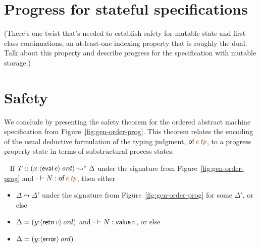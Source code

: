 \section{Progress for stateful specifications}
\label{sec:progess-mutable}

(There's one twist that's needed to establish safety for mutable state
and first-class continuations, an at-least-one indexing property that
is roughly the dual. Talk about this property and describe progress
for the specification with mutable storage.)

\section{Safety}

We conclude by presenting the safety theorem for the ordered abstract
machine specification from Figure~\ref{fig:gen-order-prog}. This
theorem relates the encoding of the usual deductive formulation of the
typing judgment, ${\sf of}\,\lf{e}\,\lf{{\it tp}}$, to a progress
property state in terms of substructural process states.

\bigskip
\begin{theorem}~
If $T :: (x{:}{\langle {{\sf eval}\,e} \rangle}\,{{\it ord}}) \leadsto^* \Delta$
under the signature from Figure~\ref{fig:gen-order-prog} and
$\cdot \vdash N : {\sf of}\,\lf{e}\,\lf{{\it tp}}$,
then either 
\begin{itemize}
\item $\Delta \leadsto \Delta'$ under the signature from
Figure~\ref{fig:gen-order-prog} for some $\Delta'$, or else
\item $\Delta = (y{:}\istrue{\susp{{\sf retn}\,\lf{v}}})$ and $\cdot \vdash N : {\sf value}\,\lf{v}$, or else
\item $\Delta = (y{:}{\langle {{\sf error}} \rangle}\,{{\it ord}})$.
\end{itemize}
\end{theorem}

